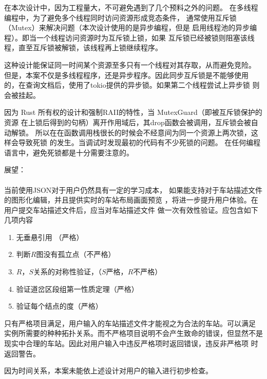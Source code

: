 \begin{keturon}
    在本次设计中，因为工程量大，不可避免遇到了几个预料之外的问题。
    在多线程编程中，为了避免多个线程同时访问资源形成竞态条件，
    通常使用互斥锁（Mutex）来解决问题（本次设计使用的是异步编程，但是
    启用线程池的异步编程）。即当一个线程访问资源时为互斥锁上锁，如果
    互斥锁已经被锁则阻塞该线程，直至互斥锁被解锁，该线程再上锁继续程序。

    这种设计能保证同一时间某个资源至多只有一个线程对其存取，从而避免竞险。
    但是，本案不仅是多线程程序，还是异步程序。因此同步互斥锁是不能够使用
    的，在查询文档后，使用了tokio提供的异步锁。如果第二个线程尝试上异步锁
    则会被挂起。

    因为 Rust 所有权的设计和强制RAII的特性，当 MutexGuard（即被互斥锁保护的资源
    在上锁后得到的句柄）离开作用域后，其drop函数会被调用，互斥锁会被自动解锁。
    所以在在函数调用栈很长的时候会不经意间为同一个资源上两次锁，这样会导致死锁
    的发生。当调试时发现最初的代码有不少死锁的问题。
    在任何编程语言中，避免死锁都是十分需要注意的。

    展望：

    \paragraph{} 当前使用JSON对于用户仍然具有一定的学习成本，
    如果能支持对于车站描述文件的图形化编辑，并且提供实时的车站布局画面预览
    ，将进一步提升用户体验。在用户提交车站描述文件后，应当对车站描述文件
    做一次有效性验证。应包含如下几项内容
    \begin{enumerate}[\indent i.]
        \item 无垂悬引用 （严格）
        \item 判断$R$图没有孤立点（不严格）
        \item $R$，$S$关系的对称性验证，（$S$严格，$R$不严格）
        \item 验证道岔区段组第一性质定理（严格）
        \item 验证每个结点的度（严格）
    \end{enumerate}
    只有严格项目满足，用户输入的车站描述文件才能视之为合法的车站。可以满足
    实例所需要的种种拓扑关系。而不严格项目说明不会产生致命的错误，但显然不是
    现实中合理的车站。因此对用户输入中违反严格项时返回错误，违反非严格项
    时返回警告。

    因为时间关系，本案未能依上述设计对用户的输入进行初步检查。



\end{keturon}
